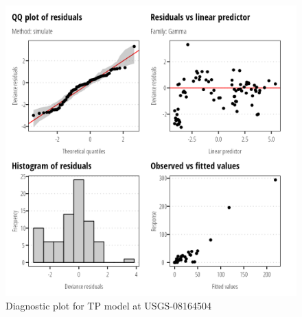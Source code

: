\documentclass[
]{article}
\begin{document}
\clearpage

\begin{figure}[h]

{\centering \includegraphics{model_assessment_files/figure-pdf/unnamed-chunk-46-1.png}

}

\caption{Diagnostic plot for TP model at USGS-08164504}

\end{figure}
\end{document}
